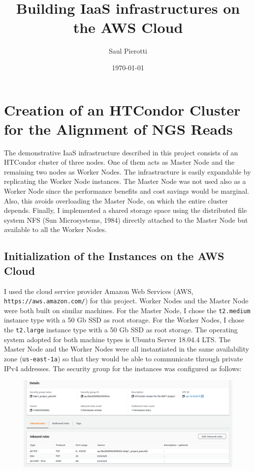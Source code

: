 \documentclass{article}
\begin{document}
\title{Building IaaS infrastructures on the AWS Cloud}
\author{Saul Pierotti}
\date{\today}

\maketitle

\section{Creation of an HTCondor Cluster for the Alignment of NGS Reads}
The demonstrative IaaS infrastructure described in this project consists of an HTCondor cluster of three nodes.
One of them acts as Master Node and the remaining two nodes as Worker Nodes.
The infrastructure is easily expandable by replicating the Worker Node instances.
The Master Node was not used also as a Worker Node since the performance benefits and cost savings would be marginal.
Also, this avoids overloading the Master Node, on which the entire cluster depends.
Finally, I implemented a shared storage space using the distributed file system NFS (Sun Microsystems, 1984) directly attached to the Master Node but available to all the Worker Nodes.

\subsection{Initialization of the Instances on the AWS Cloud}
I used the cloud service provider Amazon Web Services (AWS, \texttt{https://aws.amazon.com/}) for this project.
Worker Nodes and the Master Node were both built on similar machines.
For the Master Node, I chose the \texttt{t2.medium} instance type with a 50 Gb SSD as root storage.
For the Worker Nodes, I chose the \texttt{t2.large} instance type with a 50 Gb SSD as root storage.
The operating system adopted for both machine types is Ubuntu Server 18.04.4 LTS.
The Master Node and the Worker Nodes were all instantiated in the same availability zone (\texttt{us-east-1a}) so that they would be able to communicate through private IPv4 addresses.
The security group for the instances was configured as follows:

\begin{figure}[!h]
    \center
    \includegraphics[width=\textwidth]{./images/security-group.png}
\end{figure}
\end{document}
